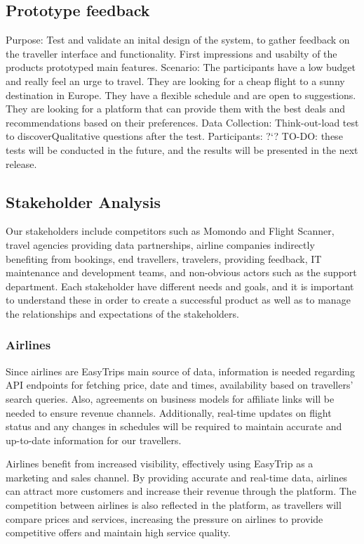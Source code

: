 \subsection{Prototype feedback}
Purpose: Test and validate an inital design of the system, to gather feedback on the traveller interface and functionality. First impressions and usabilty of the products prototyped main features.
Scenario: The participants have a low budget and really feel an urge to travel. They are looking for a cheap flight to a sunny destination in Europe. They have a flexible schedule and are open to suggestions. They are looking for a platform that can provide them with the best deals and recommendations based on their preferences.
Data Collection: Think-out-load test to discoverQualitative questions after the test.
Participants: ?`?
TO-DO: these tests will be conducted in the future, and the results will be presented in the next release.

\subsection{Stakeholder Analysis}
Our stakeholders include competitors such as Momondo and Flight Scanner, travel agencies providing data partnerships, airline companies indirectly benefiting from bookings, end travellers, travelers, providing feedback, IT maintenance and development teams, and non-obvious actors such as the support department. Each stakeholder have different needs and goals, and it is important to understand these in order to create a successful product as well as to manage the relationships and expectations of the stakeholders.

\subsubsection{Airlines}
Since airlines are EasyTrips main source of data, information is needed regarding API endpoints for fetching price, date and times, availability based on travellers' search queries. Also, agreements on business models for affiliate links will be needed to ensure revenue channels. Additionally, real-time updates on flight status and any changes in schedules will be required to maintain accurate and up-to-date information for our travellers.


Airlines benefit from increased visibility, effectively using EasyTrip as a marketing and sales channel. By providing accurate and real-time data, airlines can attract more customers and increase their revenue through the platform. The competition between airlines is also reflected in the platform, as travellers will compare prices and services, increasing the pressure on airlines to provide competitive offers and maintain high service quality.

